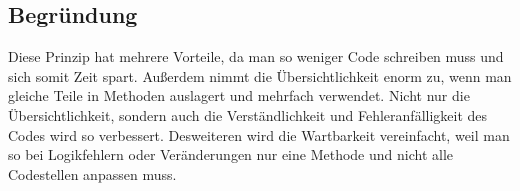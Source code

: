     \subsection{Begründung}
    Diese Prinzip hat mehrere Vorteile, da man so weniger Code schreiben muss und sich somit Zeit spart. Außerdem nimmt die Übersichtlichkeit enorm zu, wenn man gleiche Teile in Methoden auslagert und mehrfach verwendet. Nicht nur die Übersichtlichkeit, sondern auch die Verständlichkeit und Fehleranfälligkeit des Codes wird so verbessert. Desweiteren wird die Wartbarkeit vereinfacht, weil man so bei Logikfehlern oder Veränderungen nur eine Methode und nicht alle Codestellen anpassen muss.